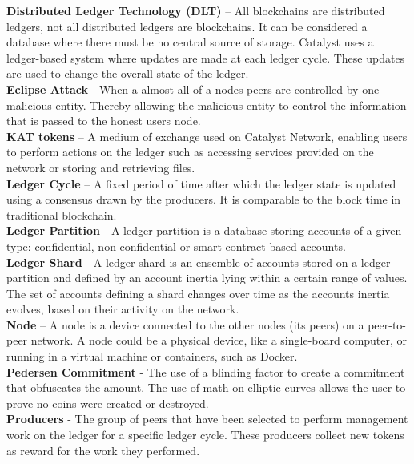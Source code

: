 \textbf{Distributed Ledger Technology (DLT)} – All blockchains are distributed ledgers, not all distributed ledgers are blockchains. It can be considered a database where there must be no central source of storage. Catalyst uses a ledger-based system where updates are made at each ledger cycle. These updates are used to change the overall state of the ledger. \\

\textbf{Eclipse Attack} - When a almost all of a nodes peers are controlled by one malicious entity. Thereby allowing the malicious entity to control the information that is passed to the honest users node. \\

\textbf{KAT tokens} – A medium of exchange used on Catalyst Network, enabling users to perform actions on the ledger such as accessing services provided on the network or storing and retrieving files. \\

\textbf{Ledger Cycle} – A fixed period of time after which the ledger state is updated using a consensus drawn by the producers. It is comparable to the block time in traditional blockchain. \\

\textbf{Ledger Partition} - A ledger partition is a database storing accounts of a given type: confidential, non-confidential or smart-contract based accounts. \\

\textbf{Ledger Shard} - A ledger shard is an ensemble of accounts stored on a ledger partition and defined  by an account inertia lying within a certain range of values. The set of accounts defining a shard changes over time as the accounts inertia evolves, based on their activity on the network. \\

\textbf{Node} – A node is a device connected to the other nodes (its peers) on a peer-to-peer network. A node could be a physical device, like a single-board computer, or running in a virtual machine or containers, such as Docker. \\

\textbf{Pedersen Commitment} - The use of a blinding factor to create a commitment that obfuscates the amount. The use of math on elliptic curves allows the user to prove no coins were created or destroyed. \\

\textbf{Producers} - The group of peers that have been selected to perform management work on the ledger for a specific ledger cycle. These producers collect new tokens as reward for the work they performed. \\

